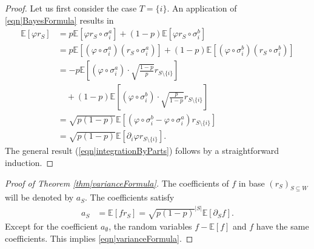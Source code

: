 \documentclass[reqno]{amsart}
\begin{document}
\begin{proof}
Let us first consider the case $T=\{i\}$. An application of \eqref{eqn|BayesFormula} results in 
\begin{align*}
\mathbb E\left[\varphi r_S\right]&=p\mathbb E\left[\varphi r_S\circ\sigma_i^a\right]+(1-p)\mathbb E\left[\varphi r_S\circ\sigma_i^b\right]\\
&=p\mathbb E\left[\left(\varphi\circ\sigma_i^a\right) \left(r_S\circ\sigma_i^a\right)\right]+(1-p)\mathbb E\left[\left(\varphi \circ\sigma_i^b\right)\left( r_S\circ\sigma_i^b\right)\right]\\
&=-p\mathbb E\left[\left(\varphi\circ\sigma_i^a\right) \cdot \sqrt{\frac{1-p}{p}} r_{S\setminus \{i\}} \right] \\
&\quad+(1-p)\mathbb E\left[\left(\varphi \circ\sigma_i^b\right)
\cdot  \sqrt{\frac{p}{1-p}} r_{S\setminus \{i\}}\right]\\
&=\sqrt{p(1-p)}\mathbb E\left[\left(\varphi\circ\sigma_i^b-\varphi\circ\sigma_i^a\right)  r_{S\setminus \{i\}} \right]\\
&=\sqrt{p(1-p)}\mathbb E\left[\partial_i\varphi r_{S\setminus\{i\}}\right].
\end{align*}
The general result (\ref{eqn|integrationByParts}) follows by a straightforward induction. 
\end{proof}

\begin{proof}[Proof of Theorem \ref{thm|varianceFormula}] The coefficients of $f$ in base $\left(r_S\right)_{S\subseteq W}$ will be denoted by $a_S$. The coefficients satisfy 
\begin{align*}
a_S&=\mathbb E\left[fr_S\right]=\sqrt{p(1-p)}^{|S|}\mathbb E\left[\partial_Sf\right].
\end{align*}
Except for the coefficient $a_{\emptyset}$, the random variables $f-\mathbb E[f]$ and $f$ have the same coefficients. This implies \eqref{eqn|varianceFormula}.
\end{proof}
 
\end{document}
